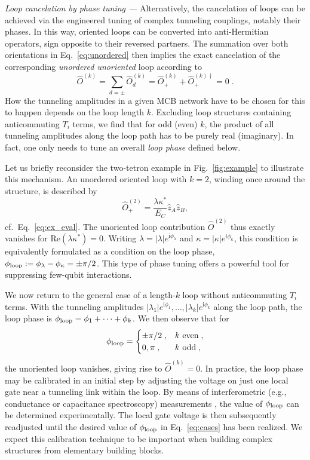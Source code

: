 \documentclass[twocolumn,floats,prx,showpacs]{revtex4-1}
\begin{document}
\emph{Loop cancelation by phase tuning ---} Alternatively, the cancelation of loops can be achieved via the engineered tuning of complex tunneling couplings, notably their phases. In this way, oriented loops can be converted into anti-Hermitian operators, sign opposite to their reversed partners. The  summation over both orientations in Eq.~\eqref{eq:unordered} then implies the 
exact cancelation of the corresponding \emph{unordered unoriented} loop
according to
\begin{equation}
\hat O^{(k)}=\sum_{d=\pm } \hat O^{(k)}_d = \hat O^{(k)}_+ + \hat O^{(k)\dagger}_+ = 0\;. \label{eq:undirected}
\end{equation}
How the tunneling amplitudes in a given MCB network have to be chosen for this to happen 
depends on the loop length $k$. Excluding loop structures containing
anticommuting $T_i$ terms, we find that for odd (even) $k$, the product of all tunneling amplitudes along the loop path 
has to be purely real (imaginary). In fact, one only needs to tune an overall \emph{loop phase} defined below.

Let us briefly reconsider the two-tetron example in Fig.~\ref{fig:example} to illustrate this mechanism. An unordered oriented loop with $k=2$, winding once around the structure, is described by
\begin{equation}
\hat O^{(2)}_+=\frac{\lambda  \kappa^\ast}{E_C} \hat z_A  \hat z_B, 
\end{equation}
cf.~Eq.~\eqref{eq:ex_eval}.
The unoriented loop contribution $\hat O^{(2)}$ thus exactly vanishes for
$\text{Re}(\lambda  \kappa^*)=0$.  Writing $\lambda=|\lambda|e^{\mathrm i \phi_\lambda}$ and $\kappa=|\kappa|e^{i\phi_\kappa}$, this condition is equivalently 
formulated as a condition on the loop phase, 
$\phi_{\rm loop}:= \phi_\lambda-\phi_{\kappa}=\pm \pi/2$.
This type of phase tuning offers a powerful tool for suppressing few-qubit interactions. 

We now return to the general case of a length-$k$ loop without anticommuting $T_i$ 
terms.   With the tunneling amplitudes $|\lambda_1|e^{\mathrm i \phi_1},\ldots,|\lambda_k|e^{\mathrm i \phi_k}$ along the loop path, the loop phase is 
$\phi_{\rm loop}=\phi_1+\cdots+\phi_k$.  We then observe that for
\begin{equation}\label{eq:cases}
\phi_{\rm loop}= \begin{cases} \pm \pi/2\;,  &k \textrm{ even}\;, \\ 0,\pi\;,  &k \textrm{ odd}\;, \end{cases}
\end{equation}
the unoriented loop vanishes, giving rise to $\hat O^{(k)}=0$.
In practice, the loop phase may be calibrated in an initial step by adjusting the voltage on just one local gate near a tunneling link within the loop. By means of interferometric (e.g., conductance or capacitance spectroscopy) measurements \cite{Plugge2017,Karzig2017}, the value of $\phi_{\rm loop}$ can be determined experimentally.  The local gate voltage is then subsequently readjusted until the desired 
value of $\phi_{\rm loop}$ in Eq.~\eqref{eq:cases} has been realized. We expect this calibration technique to be important when 
building complex structures from elementary building blocks.
\end{document}
